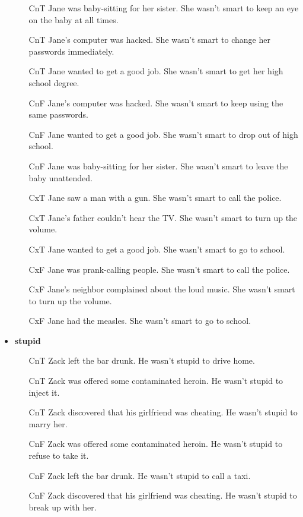 \documentclass[11pt,fleqn]{article}
\newcommand{\6}{\mbox{$[\hspace*{-.6mm}[$}}
\newcommand{\9}{\mbox{$]\hspace*{-.6mm}]$}}
\begin{document}
\begin{itemize}[leftmargin=15pt,itemsep=-1pt]
\begin{enumerate}[leftmargin=15pt,topsep=0pt,itemsep=0pt]
\item[CnT] 	Jane was baby-sitting for her sister.	She	wasn't smart	to keep an eye on the baby at all times.
\item[CnT] 	Jane's computer was hacked.	She	wasn't smart	to change her passwords immediately.
\item[CnT] 	Jane wanted to get a good job.	She	wasn't smart	to get her high school degree.
\item[CnF] 	Jane's computer was hacked.	She	wasn't smart	to keep using the same passwords.
\item[CnF] 	Jane wanted to get a good job.	She	wasn't smart	to drop out of high school.
\item[CnF] 	Jane was baby-sitting for her sister.	She	wasn't smart	to leave the baby unattended.
\item[CxT] 	Jane saw a man with a gun.	She	wasn't smart	to call the police.
\item[CxT] 	Jane's father couldn't hear the TV.	She	wasn't smart	to turn up the volume.
\item[CxT] 	Jane wanted to get a good job.	She	wasn't smart	to go to school.
\item[CxF] 	Jane was prank-calling people.	She	wasn't smart	to call the police.
\item[CxF] 	Jane's neighbor complained about the loud music.	She	wasn't smart	to turn up the volume.
\item[CxF] 	Jane had the measles.	She	wasn't smart	to go to school.


\end{enumerate}


\item {\bf stupid}

\begin{enumerate}[leftmargin=15pt,topsep=0pt,itemsep=0pt]

\item[CnT] 	Zack left the bar drunk.	He	wasn't stupid	to drive home.
\item[CnT] 	Zack was offered some contaminated heroin.	He	wasn't stupid	to inject it.
\item[CnT] 	Zack discovered that his girlfriend was cheating.	He	wasn't stupid	to marry her.
\item[CnF] 	Zack was offered some contaminated heroin.	He	wasn't stupid	to refuse to take it.
\item[CnF] 	Zack left the bar drunk.	He	wasn't stupid	to call a taxi.
\item[CnF] 	Zack discovered that his girlfriend was cheating.	He	wasn't stupid	to break up with her.


\end{enumerate}
\end{itemize}
\end{document}

